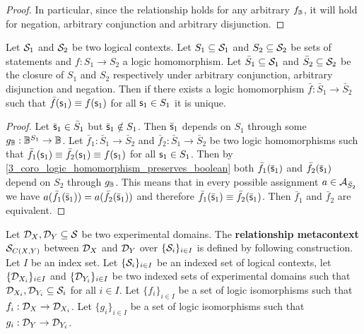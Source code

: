 \documentclass[11pt,letterpaper,fleqn]{memoir} %
\begin{document}
\begin{mathSection}
\begin{proof}
	In particular, since the relationship holds for any arbitrary $f_\Bool$, it will hold for negation, arbitrary conjunction and arbitrary disjunction.
\end{proof}

\begin{prop}
	Let $\logCtx_1$ and $\logCtx_2$ be two logical contexts. Let $S_1 \subseteq \logCtx_1$ and $S_2 \subseteq \logCtx_2$ be sets of statements and $f : S_1 \to S_2$ a logic homomorphism. Let $\bar{S}_1 \subseteq \logCtx_1$ and $\bar{S}_2 \subseteq \logCtx_2$ be the closure of $S_1$ and $S_2$ respectively under arbitrary conjunction, arbitrary disjunction and negation. Then if there exists a logic homomorphism $\bar{f} : \bar{S}_1 \to \bar{S}_2$ such that $\bar{f}(\stmt_1) \equiv f(\stmt_1)$ for all $\stmt_1 \in S_1$ it is unique.
\end{prop}

\begin{proof}
	Let $\tstmt_1 \in \bar{S}_1$ but $\tstmt_1 \notin S_1$. Then $\tstmt_1$ depends on $S_1$ through some $g_\Bool : \Bool^{S_1} \to \Bool$. Let $\bar{f}_1 : \bar{S}_1 \to \bar{S}_2$ and $\bar{f}_2 : \bar{S}_1 \to \bar{S}_2$ be two logic homomorphisms such that $\bar{f}_1(\stmt_1) \equiv \bar{f}_2(\stmt_1) \equiv f(\stmt_1)$ for all $\stmt_1 \in S_1$. Then by \ref{3_coro_logic_homomorphism_preserves_boolean} both $\bar{f}_1(\tstmt_1)$ and $\bar{f}_2(\tstmt_1)$ depend on $S_2$ through $g_\Bool$. This means that in every possible assignment $a \in \pAss[\bar{S}_2]$ we have $a(\bar{f}_1(\tstmt_1)) = a(\bar{f}_2(\tstmt_1))$  and therefore $\bar{f}_1(\tstmt_1) \equiv \bar{f}_2(\tstmt_1)$. Then $\bar{f}_1$ and $\bar{f}_2$ are equivalent.
\end{proof}


\begin{defn}
	Let $\edomain_X, \edomain_Y \subseteq \logCtx$ be two experimental domains. The \textbf{relationship metacontext}  $\logCtx_{C(X,Y)}$ between $\edomain_X$ and $\edomain_Y$ over $\{ \logCtx_i \}_{i \in I}$ is defined by following construction. Let $I$ be an index set. Let $\{ \logCtx_i \}_{i \in I}$ be an indexed set of logical contexts, let $\{ \edomain_{X_i} \}_{i \in I}$ and $\{ \edomain_{Y_i} \}_{i \in I}$ be two indexed sets of experimental domains such that $\edomain_{X_i}, \edomain_{Y_i} \subseteq \logCtx_i$ for all $i \in I$. Let $\{f_{i}\}_{i \in I}$ be a set of logic isomorphisms such that $f_{i} : \edomain_{X} \to \edomain_{X_i}$. Let $\{g_{i}\}_{i \in I}$ be a set of logic isomorphisms such that $g_{i} : \edomain_{Y} \to \edomain_{Y_i}$.
	

\end{defn}
\end{mathSection}
\end{document}

